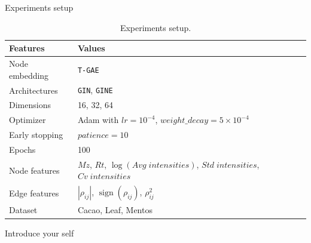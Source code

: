 \documentclass[aspectratio=169]{beamer}
\begin{document}
    \begin{frame}{Experiments setup}

        \begin{table}[htp!]
            \centering
            \caption{Experiments setup.}
            \begin{tabular}{@{}ll@{}}\toprule
                Features & Values \\\midrule
                Node embedding & 
                \texttt{T-GAE} \\
                Architectures & \texttt{GIN}, \texttt{GINE} \\
                Dimensions & 16, 32, 64 \\ %
                Optimizer & Adam with $lr=10^{-4}$, $weight\_decay=5 \times 10^{-4}$ \\
                Early stopping & $patience=10$ \\
                Epochs & 100 \\\midrule
                Node features & $Mz$, $Rt$, $\operatorname{log}(Avg\; intensities)$, $Std\; intensities$, $Cv\; intensities$ \\
                Edge features & $|\rho_{ij}|$, $\operatorname{sign}(\rho_{ij})$, $\rho_{ij}^{2}$ \\\midrule
                Dataset & Cacao, Leaf, Mentos \\\bottomrule
            \end{tabular}
        \end{table}

        \begin{note}
            {Introduce your self}
        \end{note}
    \end{frame}
\end{document}
